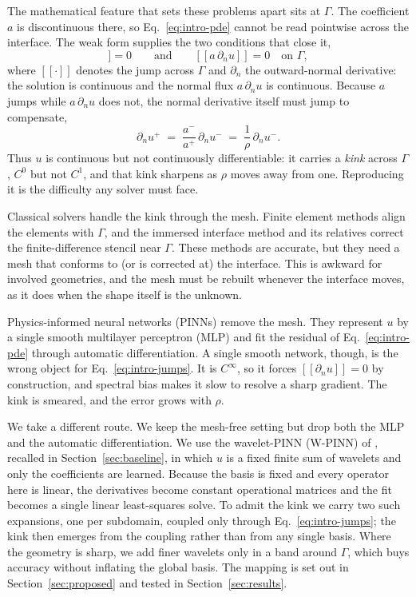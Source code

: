 \documentclass[pdflatex,sn-mathphys-num]{sn-jnl}%
\theoremstyle{thmstyleone}%
\theoremstyle{thmstyletwo}%
\theoremstyle{thmstylethree}%
\begin{document}
The mathematical feature that sets these problems apart sits at $\Gamma$. The coefficient $a$ is discontinuous there, so Eq.~\eqref{eq:intro-pde} cannot be read pointwise across the interface. The weak form supplies the two conditions that close it,
\begin{equation}
[\![u]\!]=0
\qquad\text{and}\qquad
[\![a\,\partial_n u]\!]=0
\quad\text{on }\Gamma,
\label{eq:intro-jumps}
\end{equation}
where $[\![\cdot]\!]$ denotes the jump across $\Gamma$ and $\partial_n$ the outward-normal derivative: the solution is continuous and the normal flux $a\,\partial_n u$ is continuous. Because $a$ jumps while $a\,\partial_n u$ does not, the normal derivative itself must jump to compensate,
\begin{equation}
\partial_n u^+ \;=\; \frac{a^-}{a^+}\,\partial_n u^- \;=\; \frac{1}{\rho}\,\partial_n u^-.
\label{eq:intro-kink}
\end{equation}
Thus $u$ is continuous but not continuously differentiable: it carries a \emph{kink} across $\Gamma$, $C^0$ but not $C^1$, and that kink sharpens as $\rho$ moves away from one. Reproducing it is the difficulty any solver must face.

Classical solvers handle the kink through the mesh. Finite element methods align the elements with $\Gamma$, and the immersed interface method and its relatives correct the finite-difference stencil near $\Gamma$. These methods are accurate, but they need a mesh that conforms to (or is corrected at) the interface. This is awkward for involved geometries, and the mesh must be rebuilt whenever the interface moves, as it does when the shape itself is the unknown.

Physics-informed neural networks (PINNs) remove the mesh. They represent $u$ by a single smooth multilayer perceptron (MLP) and fit the residual of Eq.~\eqref{eq:intro-pde} through automatic differentiation. A single smooth network, though, is the wrong object for Eq.~\eqref{eq:intro-jumps}. It is $C^\infty$, so it forces $[\![\partial_n u]\!]=0$ by construction, and spectral bias makes it slow to resolve a sharp gradient. The kink is smeared, and the error grows with $\rho$.

We take a different route. We keep the mesh-free setting but drop both the MLP and the automatic differentiation. We use the wavelet-PINN (W-PINN) of \cite{pandey2026}, recalled in Section~\ref{sec:baseline}, in which $u$ is a fixed finite sum of wavelets and only the coefficients are learned. Because the basis is fixed and every operator here is linear, the derivatives become constant operational matrices and the fit becomes a single linear least-squares solve. To admit the kink we carry two such expansions, one per subdomain, coupled only through Eq.~\eqref{eq:intro-jumps}; the kink then emerges from the coupling rather than from any single basis. Where the geometry is sharp, we add finer wavelets only in a band around $\Gamma$, which buys accuracy without inflating the global basis. The mapping is set out in Section~\ref{sec:proposed} and tested in Section~\ref{sec:results}.
\end{document}
